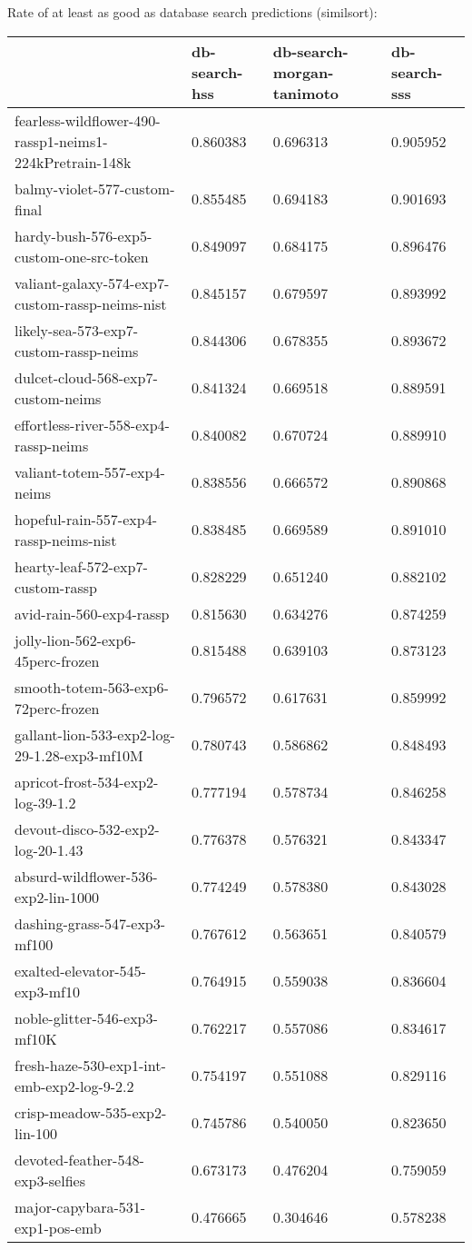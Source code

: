 Rate of at least as good as database search predictions (similsort):
\begin{tabular}{llll}
\toprule
 & db-search-hss & db-search-morgan-tanimoto & db-search-sss \\
\midrule
fearless-wildflower-490-rassp1-neims1-224kPretrain-148k & 0.860383 & 0.696313 & 0.905952 \\
balmy-violet-577-custom-final & 0.855485 & 0.694183 & 0.901693 \\
hardy-bush-576-exp5-custom-one-src-token & 0.849097 & 0.684175 & 0.896476 \\
valiant-galaxy-574-exp7-custom-rassp-neims-nist & 0.845157 & 0.679597 & 0.893992 \\
likely-sea-573-exp7-custom-rassp-neims & 0.844306 & 0.678355 & 0.893672 \\
dulcet-cloud-568-exp7-custom-neims & 0.841324 & 0.669518 & 0.889591 \\
effortless-river-558-exp4-rassp-neims & 0.840082 & 0.670724 & 0.889910 \\
valiant-totem-557-exp4-neims & 0.838556 & 0.666572 & 0.890868 \\
hopeful-rain-557-exp4-rassp-neims-nist & 0.838485 & 0.669589 & 0.891010 \\
hearty-leaf-572-exp7-custom-rassp & 0.828229 & 0.651240 & 0.882102 \\
avid-rain-560-exp4-rassp & 0.815630 & 0.634276 & 0.874259 \\
jolly-lion-562-exp6-45perc-frozen & 0.815488 & 0.639103 & 0.873123 \\
smooth-totem-563-exp6-72perc-frozen & 0.796572 & 0.617631 & 0.859992 \\
gallant-lion-533-exp2-log-29-1.28-exp3-mf10M & 0.780743 & 0.586862 & 0.848493 \\
apricot-frost-534-exp2-log-39-1.2 & 0.777194 & 0.578734 & 0.846258 \\
devout-disco-532-exp2-log-20-1.43 & 0.776378 & 0.576321 & 0.843347 \\
absurd-wildflower-536-exp2-lin-1000 & 0.774249 & 0.578380 & 0.843028 \\
dashing-grass-547-exp3-mf100 & 0.767612 & 0.563651 & 0.840579 \\
exalted-elevator-545-exp3-mf10 & 0.764915 & 0.559038 & 0.836604 \\
noble-glitter-546-exp3-mf10K & 0.762217 & 0.557086 & 0.834617 \\
fresh-haze-530-exp1-int-emb-exp2-log-9-2.2 & 0.754197 & 0.551088 & 0.829116 \\
crisp-meadow-535-exp2-lin-100 & 0.745786 & 0.540050 & 0.823650 \\
devoted-feather-548-exp3-selfies & 0.673173 & 0.476204 & 0.759059 \\
major-capybara-531-exp1-pos-emb & 0.476665 & 0.304646 & 0.578238 \\
\bottomrule
\end{tabular}



